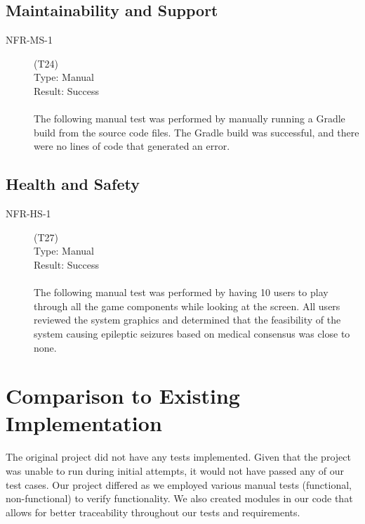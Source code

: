 \documentclass[12pt, titlepage]{article}
\begin{document}
\subsection{Maintainability and Support}

\begin{description}
    \item[NFR-MS-1] (T24)\\
        Type: Manual\\
        Result: Success\\
        \\
        The following manual test was performed by manually running a Gradle build from the source code files. The Gradle build was successful, and there were no lines of code that generated an error.

\end{description}

\subsection{Health and Safety}

\begin{description}
    \item[NFR-HS-1] (T27)\\
    Type: Manual\\
    Result: Success\\
    \\
    The following manual test was performed by having 10 users to play through all the game components while looking at the screen. All users reviewed the system graphics and determined that the feasibility of the system causing epileptic seizures based on medical consensus was close to none.

\end{description}

\section{Comparison to Existing Implementation}

The original project did not have any tests implemented. Given that the project was unable to run during initial attempts, it would not have passed any of our test cases. Our project differed as we employed various manual tests (functional, non-functional) to verify functionality. We also created modules in our code that allows for better traceability throughout our tests and requirements.
\end{document}
